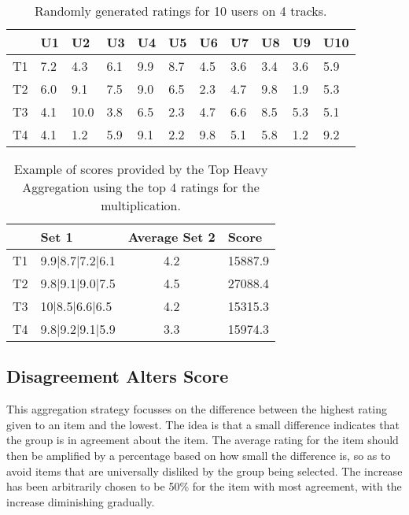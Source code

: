 \begin{table}[H]
	\centering
	\begin{tabular}{|l|l|l|l|l|l|l|l|l|l|l|}
		\hline
		& U1  & U2   & U3  & U4  & U5  & U6  & U7  & U8  & U9  & U10 \\ \hline
		T1 & 7.2 & 4.3  & 6.1 & 9.9 & 8.7 & 4.5 & 3.6 & 3.4 & 3.6 & 5.9 \\ \hline
		T2 & 6.0 & 9.1  & 7.5 & 9.0 & 6.5 & 2.3 & 4.7 & 9.8 & 1.9 & 5.3 \\ \hline
		T3 & 4.1 & 10.0 & 3.8 & 6.5 & 2.3 & 4.7 & 6.6 & 8.5 & 5.3 & 5.1 \\ \hline
		T4 & 4.1 & 1.2  & 5.9 & 9.1 & 2.2 & 9.8 & 5.1 & 5.8 & 1.2 & 9.2 \\ \hline
	\end{tabular}
	\caption{Randomly generated ratings for 10 users on 4 tracks.}
	\label{tbl:randomdatasample}
\end{table}

\begin{table}[H]
	\centering
	\begin{tabular}{|l|l|c|l|}
		\hline
		& Set 1           & \multicolumn{1}{l|}{Average Set 2} & Score   \\ \hline
		T1 & 9.9|8.7|7.2|6.1 & 4.2                                & 15887.9 \\ \hline
		T2 & 9.8|9.1|9.0|7.5 & 4.5                                & 27088.4 \\ \hline
		T3 & 10|8.5|6.6|6.5  & 4.2                                & 15315.3 \\ \hline
		T4 & 9.8|9.2|9.1|5.9 & 3.3                                & 15974.3 \\ \hline
	\end{tabular}
	\caption{Example of scores provided by the Top Heavy Aggregation using the top 4 ratings for the multiplication.}
	\label{tbl:topheavyaggregation}
\end{table}

\subsection{Disagreement Alters Score}
This aggregation strategy focusses on the difference between the highest rating given to an item and the lowest. The idea is that a small difference indicates that the group is in agreement about the item.
The average rating for the item should then be amplified by a percentage based on how small the difference is, so as to avoid items that are universally disliked by the group being selected. The increase has been arbitrarily chosen to be 50\% for the item with most agreement, with the increase diminishing gradually.


